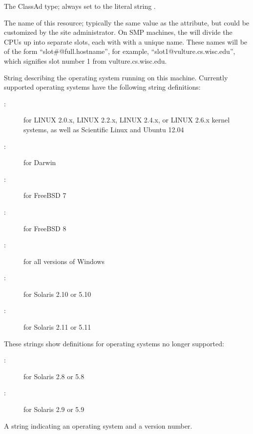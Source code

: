\begin{description}
\item[\AdAttr{MyType}:] The ClassAd type; always set to the literal string .
%
\item[\AdAttr{Name}:] The name of this resource; typically the same value as
the  attribute, but could be customized by the site
administrator.
On SMP machines, the  will divide the CPUs up into separate
slots, each with with a unique name.
These names will be of the form ``slot\#@full.hostname'', for example,
``slot1@vulture.cs.wisc.edu'', which signifies slot number 1 from
vulture.cs.wisc.edu.
%
\label{OpSys-machine-attribute}
\item[\AdAttr{OpSys}:] String describing the operating system running on this
machine.  
Currently supported operating systems have the following string
definitions:
	\begin{description}
	\item[:] for LINUX 2.0.x, LINUX 2.2.x,
	LINUX 2.4.x, or LINUX 2.6.x kernel systems, as well as Scientific Linux 
        and Ubuntu 12.04
	\item[:] for Darwin
	\item[:] for FreeBSD 7
	\item[:] for FreeBSD 8
	\item[:] for all versions of Windows
	\item[:] for Solaris 2.10 or 5.10
	\item[:] for Solaris 2.11 or 5.11
	\end{description}
These strings show definitions for operating systems no longer supported:
	\begin{description}
	\item[:] for Solaris 2.8 or 5.8
	\item[:] for Solaris 2.9 or 5.9
	\end{description}
%
\item[\AdAttr{OpSysAndVer}:] A string indicating an operating system and
a version number.


\end{description}
